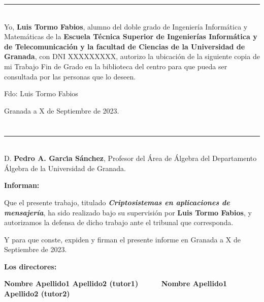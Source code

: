 \noindent\rule[-1ex]{\textwidth}{2pt}\\[4.5ex]

Yo, \textbf{Luis Tormo Fabios}, alumno del doble grado de Ingeniería Informática y Matemáticas de la \textbf{Escuela Técnica Superior
de Ingenierías Informática y de Telecomunicación y la facultad de Ciencias de la Universidad de Granada}, con DNI XXXXXXXXX, autorizo la
ubicación de la siguiente copia de mi Trabajo Fin de Grado en la biblioteca del centro para que pueda ser
consultada por las personas que lo deseen.

\vspace{6cm}

\noindent Fdo: Luis Tormo Fabios

\vspace{2cm}

\begin{flushright}
Granada a X de Septiembre de 2023.
\end{flushright}


\chapter*{}
\thispagestyle{empty}

\noindent\rule[-1ex]{\textwidth}{2pt}\\[4.5ex]

D. \textbf{Pedro A. Garcı́a Sánchez}, Profesor del Área de Álgebra del Departamento Álgebra de la Universidad de Granada.

\vspace{0.5cm}

\textbf{Informan:}

\vspace{0.5cm}

Que el presente trabajo, titulado \textit{\textbf{Criptosistemas en aplicaciones de mensajería}},
ha sido realizado bajo su supervisión por \textbf{Luis Tormo Fabios}, y autorizamos la defensa de dicho trabajo ante el tribunal
que corresponda.

\vspace{0.5cm}

Y para que conste, expiden y firman el presente informe en Granada a X de Septiembre de 2023.

\vspace{1cm}

\textbf{Los directores:}

\vspace{5cm}

\noindent \textbf{Nombre Apellido1 Apellido2 (tutor1) \ \ \ \ \ Nombre Apellido1 Apellido2 (tutor2)}

